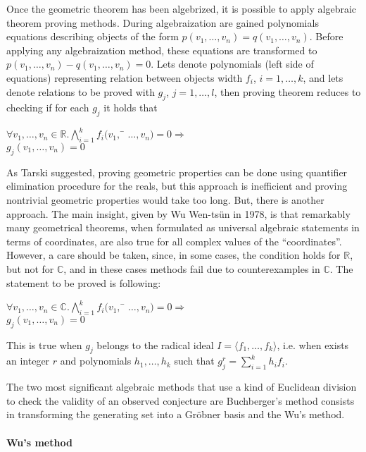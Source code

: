 \documentclass[final,1p,times,authoryear]{elsarticle}
\begin{document}
Once the geometric theorem has been algebrized, it is possible to
apply algebraic theorem proving methods. During algebraization are
gained polynomials equations describing objects of the form $p(v_1,
\ldots, v_n) = q(v_1, \ldots, v_n)$. Before applying any
algebraization method, these equations are transformed to $p(v_1,
\ldots, v_n) - q(v_1, \ldots, v_n) = 0$. Lets denote polynomials (left
side of equations) representing relation between objects width $f_i$,
$i = 1, \ldots, k$, and lets denote relations to be proved with $g_j$,
$j = 1, \ldots, l$, then proving theorem reduces to checking if for
each $g_j$ it holds that
\begin{tabbing}
$\forall v_1, \ldots, v_n \in \mathbb{R}. \bigwedge_{i = 1}^{k} f_i(v_1,$ \= $\ldots, v_n) = 0 \Longrightarrow$ \\
\> $g_j(v_1, \ldots, v_n) = 0$
\end{tabbing}

As Tarski suggested, proving geometric properties can be done using
quantifier elimination procedure for the reals, but this approach is
inefficient and proving nontrivial geometric properties would take too
long. But, there is another approach. The main insight, given by Wu
Wen-ts\"un in 1978, is that remarkably many geometrical theorems, when
formulated as universal algebraic statements in terms of coordinates,
are also true for all complex values of the “coordinates”. However, a
care should be taken, since, in some cases, the condition holds for
$\mathbb{R}$, but not for $\mathbb{C}$, and in these cases methods
fail due to counterexamples in $\mathbb{C}$. The statement to be
proved is following:
\begin{tabbing}
$\forall v_1, \ldots, v_n \in \mathbb{C}. \bigwedge_{i = 1}^{k} f_i(v_1,$ \= $\ldots, v_n) = 0 \Longrightarrow$ \\
\> $g_j(v_1, \ldots, v_n) = 0$
\end{tabbing}

This is true when $g_j$ belongs to the radical ideal $I = \langle f_1,
\ldots, f_k \rangle$, i.e. when exists an integer $r$ and polynomials
$h_1, \ldots, h_k$ such that $g_j^r = \sum_{i=1}^k h_if_i$.

The two most significant algebraic methods that use a kind of
Euclidean division to check the validity of an observed conjecture are
Buchberger’s method consists in transforming the generating set into a
Gr\"obner basis and the Wu’s method.

\paragraph{Wu's method}
\end{document}
